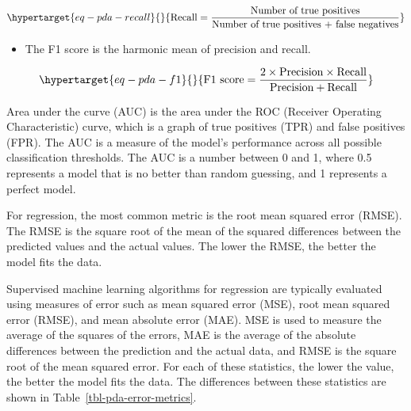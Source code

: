 \documentclass[
  letterpaper,
]{scrbook}
\providecommand{\tightlist}{%
  \setlength{\itemsep}{0pt}\setlength{\parskip}{0pt}}\usepackage{longtable,booktabs,array}
\begin{document}
\begin{equation}\protect\hypertarget{eq-pda-recall}{}{
\text{Recall} = \frac{\text{Number of true positives}}{\text{Number of true positives + false negatives}}
}\label{eq-pda-recall}\end{equation}

\begin{itemize}
\tightlist
\item
  The F1 score is the harmonic mean of precision and recall.
\end{itemize}

\begin{equation}\protect\hypertarget{eq-pda-f1}{}{
\text{F1 score} = \frac{2 \times \text{Precision} \times \text{Recall}}{\text{Precision} + \text{Recall}}
}\label{eq-pda-f1}\end{equation}

Area under the curve (AUC) is the area under the ROC (Receiver Operating
Characteristic) curve, which is a graph of true positives (TPR) and
false positives (FPR). The AUC is a measure of the model's performance
across all possible classification thresholds. The AUC is a number
between 0 and 1, where 0.5 represents a model that is no better than
random guessing, and 1 represents a perfect model.

For regression, the most common metric is the root mean squared error
(RMSE). The RMSE is the square root of the mean of the squared
differences between the predicted values and the actual values. The
lower the RMSE, the better the model fits the data.

Supervised machine learning algorithms for regression are typically
evaluated using measures of error such as mean squared error (MSE), root
mean squared error (RMSE), and mean absolute error (MAE). MSE is used to
measure the average of the squares of the errors, MAE is the average of
the absolute differences between the prediction and the actual data, and
RMSE is the square root of the mean squared error. For each of these
statistics, the lower the value, the better the model fits the data. The
differences between these statistics are shown in
Table~\ref{tbl-pda-error-metrics}.
\end{document}
